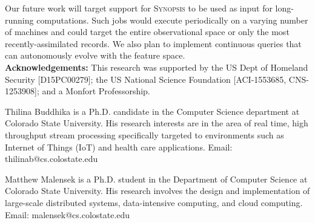 \documentclass[9pt,journal,compsoc]{IEEEtran}
\begin{document}
Our future work will target support for \textsc{Synopsis} to be used as input for long-running computations. Such jobs would execute periodically on a varying number of machines and could target the entire observational space or only the most recently-assimilated records. We also plan to implement continuous queries that can autonomously evolve with the feature space.
\vspace{1em}\\
%
%
\textbf{Acknowledgements:}
This research was supported by the US Dept of Homeland Security [D15PC00279]; the US National Science Foundation [ACI-1553685, CNS-1253908]; and a Monfort Professorship.



\vspace*{-3.7\baselineskip}
\begin{IEEEbiography}{Thilina Buddhika} is a Ph.D. candidate in the Computer Science department at Colorado State University.  His research interests are in the area of real time, high throughput stream processing specifically targeted to environments such as Internet of Things (IoT) and health care applications. Email: thilinab@cs.colostate.edu
\end{IEEEbiography}
\vspace{-1.60cm}
\begin{IEEEbiography}{Matthew Malensek} is a Ph.D. student in the Department of Computer Science at Colorado State University. His research involves the design and implementation of large-scale distributed systems, data-intensive computing, and cloud computing. Email: malensek@cs.colostate.edu
\end{IEEEbiography}
\end{document}

